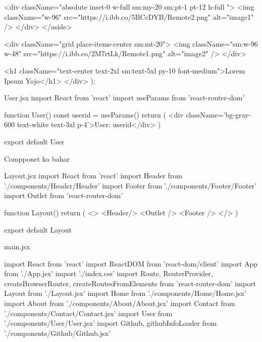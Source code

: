 {                                    <div className="absolute inset-0 w-full sm:my-20 sm:pt-1 pt-12 h-full ">
                                        <img className="w-96" src="https://i.ibb.co/5BCcDYB/Remote2.png" alt="image1" />
                                    </div>
                                </aside>

                                <div className="grid  place-items-center sm:mt-20">
                                    <img className="sm:w-96 w-48" src="https://i.ibb.co/2M7rtLk/Remote1.png" alt="image2" />
                                </div>

                                <h1 className="text-center text-2xl sm:text-5xl py-10 font-medium">Lorem Ipsum Yojo</h1>
                            </div>
                        );
                    }

User.jsx
                    import React from 'react'
                    import { useParams } from 'react-router-dom'

                    function User() {
                        const {userid} = useParams()
                    return (
                        <div className='bg-gray-600 text-white text-3xl p-4'>User: {userid}</div>
                    )
                    }

                    export default User


Compponet ka bahar

Layout.jsx
                    import React from 'react'
                    import Header from './components/Header/Header'
                    import Footer from './components/Footer/Footer'
                    import { Outlet } from 'react-router-dom'

                    function Layout() {
                    return (
                        <>
                        <Header/>
                        <Outlet />
                        <Footer />
                        </>
                    )
                    }

                    export default Layout

main.jsx

                    import React from 'react'
                    import ReactDOM from 'react-dom/client'
                    import App from './App.jsx'
                    import './index.css'
                    import { Route, RouterProvider, createBrowserRouter, createRoutesFromElements } from 'react-router-dom'
                    import Layout from './Layout.jsx'
                    import Home from './components/Home/Home.jsx'
                    import About from './components/About/About.jsx'
                    import Contact from './components/Contact/Contact.jsx'
                    import User from './components/User/User.jsx'
                    import Github, { githubInfoLoader } from './components/Github/Github.jsx'

